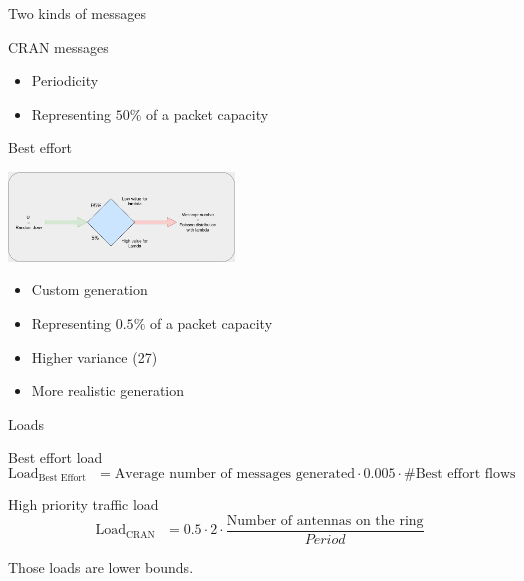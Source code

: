 \documentclass[10 pt]{beamer}
\begin{document}
\begin{frame}{Two kinds of messages}

\begin{block}{CRAN messages}
\begin{itemize}
\item Periodicity
\item Representing $50\%$ of a packet capacity
\end{itemize}

\end{block}

\begin{block}{Best effort}
\begin{center}
\includegraphics [width=60mm]{hyper_expo.png}
 \begin{multicols}{2}
\begin{itemize}
\item Custom generation
\item Representing $0.5\%$ of a packet capacity
\item Higher variance (27)
\item More realistic generation
\end{itemize}
\end{multicols}
\end{center}
\end{block}

\end{frame}



\begin{frame}{ Loads}

\begin{block}{Best effort load}
$$ \text{Load$_{\text{Best Effort}}$ } = \text{Average number of messages generated} \cdot 0.005 \cdot \text{\#Best effort flows} $$
\end{block}
\vspace{1cm}
\begin{block}{High priority traffic load}
$$ \text{Load$_{\text{CRAN}}$ } = 0.5 \cdot 2\cdot \frac{\text{Number of antennas on the ring} }{Period}$$
\end{block}
Those loads are lower bounds.
\vspace{0,5cm}



\end{frame}
\end{document}
